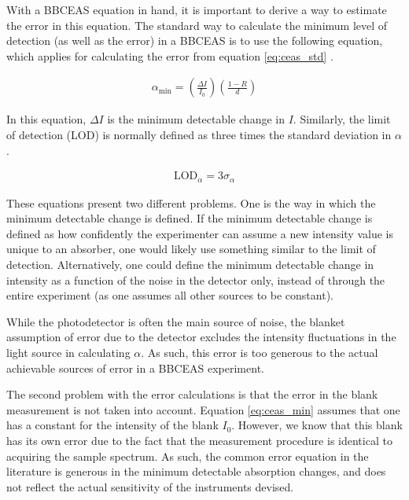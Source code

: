 With a \ac{BBCEAS} equation in hand, it is important to derive a way to
estimate the error in this equation. The standard way to calculate the minimum
level of detection (as well as the error) in a \ac{BBCEAS} is to use the
following equation, which applies for calculating the error from equation
\eqref{eq:ceas_std} \cite{Mazurenka:2005fh}.

\begin{align}
  \alpha_{\text{min}} = \left(\frac{\Delta
  I}{I_0}\right)\left(\frac{1-R}{d}\right)\label{eq:ceas_min}
\end{align}

In this equation, $\Delta I$ is the minimum detectable change in $I$.
Similarly, the limit of detection (LOD) is normally defined as three times the
standard deviation in $\alpha$ \cite{Islam:2007ea}.

\begin{align}
  \text{LOD}_{\alpha} = 3\sigma_{\alpha}\label{eq:lod}
\end{align}

These equations present two different problems.  One is the way in which the
minimum detectable change is defined. If the minimum detectable change is
defined as how confidently the experimenter can assume a new intensity value is
unique to an absorber, one would likely use something similar to the limit of
detection. Alternatively, one could define the minimum detectable change in
intensity as a function of the noise in the detector only, instead of through
the entire experiment (as one assumes all other sources to be constant).


While the photodetector is often the main source of noise, the blanket
assumption of error due to the detector excludes the intensity fluctuations in
the light source in calculating $\alpha$. As such, this error is too generous
to the actual achievable sources of error in a \ac{BBCEAS} experiment.

The second problem with the error calculations is that the error in the blank
measurement is not taken into account. Equation \eqref{eq:ceas_min} assumes
that one has a constant for the intensity of the blank $I_0$. However, we know
that this blank has its own error due to the fact that the measurement
procedure is identical to acquiring the sample spectrum. As such, the common
error equation in the literature is generous in the minimum detectable
absorption changes, and does not reflect the actual sensitivity of the
instruments devised.

